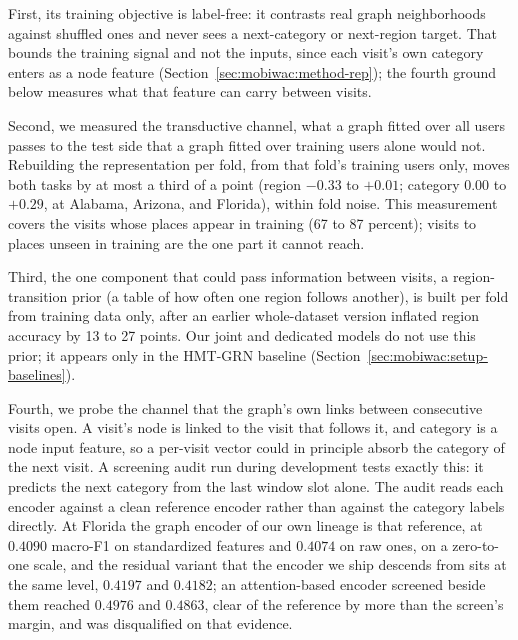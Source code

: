 First, its training objective is label-free: it contrasts real graph neighborhoods against shuffled ones and never sees a next-category or next-region target. That bounds the training signal and not the inputs, since each visit's own category enters as a node feature (Section~\ref{sec:mobiwac:method-rep}); the fourth ground below measures what that feature can carry between visits.

Second, we measured the transductive channel, what a graph fitted over all users passes to the test side that a graph fitted over training users alone would not. Rebuilding the representation per fold, from that fold's training users only, moves both tasks by at most a third of a point (region $-0.33$ to $+0.01$; category $0.00$ to $+0.29$, at Alabama, Arizona, and Florida), within fold noise. This measurement covers the visits whose places appear in training (67 to 87 percent); visits to places unseen in training are the one part it cannot reach.

Third, the one component that could pass information between visits, a region-transition prior (a table of how often one region follows another), is built per fold from training data only, after an earlier whole-dataset version inflated region accuracy by 13 to 27 points. Our joint and dedicated models do not use this prior; it appears only in the HMT-GRN baseline (Section~\ref{sec:mobiwac:setup-baselines}).

Fourth, we probe the channel that the graph's own links between consecutive visits open. A visit's node is linked to the visit that follows it, and category is a node input feature, so a per-visit vector could in principle absorb the category of the next visit. A screening audit run during development tests exactly this: it predicts the next category from the last window slot alone. The audit reads each encoder against a clean reference encoder rather than against the category labels directly. At Florida the graph encoder of our own lineage is that reference, at $0.4090$ macro-F1 on standardized features and $0.4074$ on raw ones, on a zero-to-one scale, and the residual variant that the encoder we ship descends from sits at the same level, $0.4197$ and $0.4182$; an attention-based encoder screened beside them reached $0.4976$ and $0.4863$, clear of the reference by more than the screen's margin, and was disqualified on that evidence.

